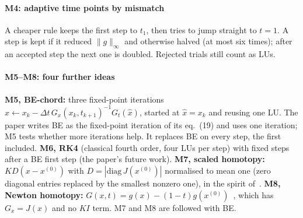 \documentclass[sigconf,nonacm]{acmart}
\newcommand{\ninf}[1]{\lVert #1\rVert_\infty}
\newcommand{\xo}{x^{(0)}}
\begin{document}
\paragraph{M4: adaptive time points by mismatch}
A cheaper rule keeps the first step to $t_1$, then tries to jump straight to $t=1$. A step is kept if it
reduced $\ninf{g}$ and otherwise halved (at most six times); after an accepted step the next one is
doubled. Rejected trials still count as LUs.

\paragraph{M5--M8: four further ideas}
\textbf{M5, BE-chord:} three fixed-point iterations
$\hat x\gets x_k-\Delta t\,G_x(x_k,t_{k+1})^{-1}G_t(\hat x)$, started at $\hat x=x_k$ and reusing one LU. The
paper writes BE as the fixed-point iteration of its eq.~(19) and uses one iteration; M5 tests whether more
iterations help. It replaces BE on every step, the first included. \textbf{M6, RK4}
(classical fourth order, four LUs per step) with fixed steps after a BE first step (the paper's future
work). \textbf{M7, scaled homotopy:} $K D(x-\xo)$ with $D=|\mathrm{diag}\,J(\xo)|$ normalised to mean one
(zero diagonal entries replaced by the smallest nonzero one), in the spirit of~\cite{freitas2023}.
\textbf{M8, Newton homotopy:} $G(x,t)=g(x)-(1-t)g(\xo)$~\cite{watson1989}, which has $G_x=J(x)$ and no $KI$
term. M7 and M8 are followed with BE.
\end{document}
